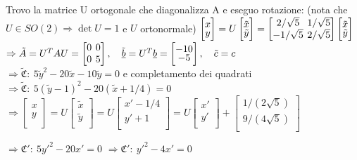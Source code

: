 Trovo la matrice U ortogonale che diagonalizza A e eseguo rotazione:
(nota che $U \in SO(2) \Rightarrow \det U = 1$ e $U$ ortonormale)
$
\begin{bmatrix}
	x \\[-0.3em]
	y \\
\end{bmatrix}
= U
\begin{bmatrix}
	\tilde{x} \\[-0.3em]
	\tilde{y} \\
\end{bmatrix}
=
\left[
	\arraycolsep=2.0pt\def\arraystretch{1.0}
	\begin{array}{@{}cc@{}}
		2/\sqrt{5} & 1/\sqrt{5} \\
		-1/\sqrt{5} & 2/\sqrt{5}
	\end{array}
\right]
\begin{bmatrix}
	\tilde{x} \\[-0.3em]
	\tilde{y} \\
\end{bmatrix}
$ \\
$
\Rightarrow \tilde{A} = U^TAU = \left[
	\arraycolsep=2.0pt\def\arraystretch{1.0}
	\begin{array}{@{}cc@{}}
		0 & 0 \\
		0 & 5
	\end{array}
\right]
,\quad
\tilde{\vec{b}} = U^T\vec{b} = \begin{bmatrix}
	-10 \\[-0.3em]
	-5 \\
\end{bmatrix}
,\quad
\tilde{c} = c
$ \\
$\Rightarrow \tilde{\mathfrak{C}}:\ 5\tilde{y}^2 - 20\tilde{x} - 10\tilde{y} = 0$ e completamento dei quadrati
$\Rightarrow \tilde{\mathfrak{C}}:\ 5(\tilde{y}-1)^2 - 20(\tilde{x}+1/4) = 0$ \\
$\Rightarrow 
\begin{bmatrix}
	x \\[-0.3em]
	y \\
\end{bmatrix}
= U
\begin{bmatrix}
	\tilde{x} \\[-0.3em]
	\tilde{y} \\
\end{bmatrix}
= U
\begin{bmatrix}
	x'-1/4 \\[-0.3em]
	y'+1 \\
\end{bmatrix}
= U 
\begin{bmatrix}
	x' \\[-0.3em]
	y' \\
\end{bmatrix}
+
\begin{bmatrix}
	1/(2\sqrt{5}) \\[-0.3em]
	9/(4\sqrt{5}) \\
\end{bmatrix}
$

$\Rightarrow \mathfrak{C}':\ 5y'^2 - 20x' = 0$
$\Rightarrow \mathfrak{C}':\ y'^2 - 4x' = 0$
